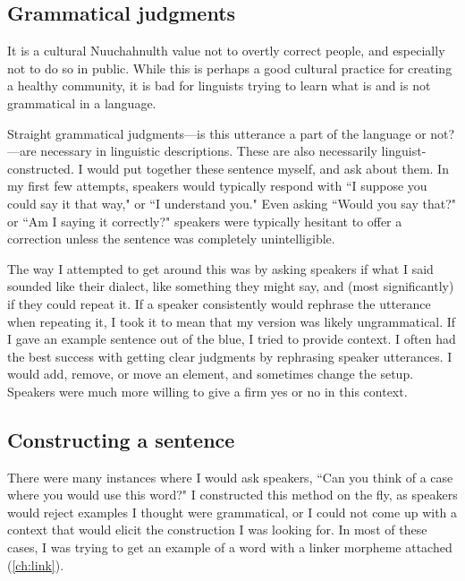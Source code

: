 \subsection{Grammatical judgments}

It is a cultural Nuuchahnulth value not to overtly correct people, and especially not to do so in public. While this is perhaps a good cultural practice for creating a healthy community, it is bad for linguists trying to learn what is and is not grammatical in a language.

Straight grammatical judgments---is this utterance a part of the language or not?---are necessary in linguistic descriptions. These are also necessarily linguist-constructed. I would put together these sentence myself, and ask about them. In my first few attempts, speakers would typically respond with ``I suppose you could say it that way," or ``I understand you." Even asking ``Would you say that?" or ``Am I saying it correctly?" speakers were typically hesitant to offer a correction unless the sentence was completely unintelligible.

The way I attempted to get around this was by asking speakers if what I said sounded like their dialect, like something they might say, and (most significantly) if they could repeat it. If a speaker consistently would rephrase the utterance when repeating it, I took it to mean that my version was likely ungrammatical. If I gave an example sentence out of the blue, I tried to provide context. I often had the best success with getting clear judgments by rephrasing speaker utterances. I would add, remove, or move an element, and sometimes change the setup. Speakers were much more willing to give a firm yes or no in this context.

\subsection{Constructing a sentence}

There were many instances where I would ask speakers, ``Can you think of a case where you would use this word?" I constructed this method on the fly, as speakers would reject examples I thought were grammatical, or I could not come up with a context that would elicit the construction I was looking for. In most of these cases, I was trying to get an example of a word with a linker morpheme attached (\cref{ch:link}).

